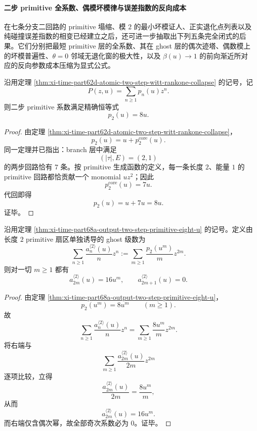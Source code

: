 \paragraph{二步 primitive 全系数、偶模坏模律与误差指数的反向成本}
在七条分支二回路的 primitive 塌缩、模 \(2\) 的最小坏模证人、正实退化点列表以及纯碰撞误差指数的相变已经建立之后，还可进一步抽取出下列五条完全闭式的后果。它们分别把最短 primitive 层的全系数、其在 ghost 层的偶次迹塔、偶数模上的坏模普遍性、\(\theta=0\) 邻域无退化窗的极大性，以及 \(\beta(u)\to 1\) 的前向渐近所对应的反向参数成本压缩为显式公式。

\begin{theorem}\label{thm:xi-time-part68a-output-two-step-primitive-eight-u}
沿用定理 \ref{thm:xi-time-part62d-atomic-two-step-witt-rankone-collapse} 的记号，记
\[
P(z,u)=\sum_{n\ge 1}p_n(u)z^n.
\]
则二步 primitive 系数满足精确恒等式
\[
p_2(u)=8u.
\]
\end{theorem}
\begin{proof}
由定理 \ref{thm:xi-time-part62d-atomic-two-step-witt-rankone-collapse}，
\[
p_2(u)=u+p_2^{\mathrm{core}}(u).
\]
同一定理并已指出：branch 层中满足
\[
(|\tau|,E)=(2,1)
\]
的两步回路恰有 \(7\) 条。按 primitive 生成函数的定义，每一条长度 \(2\)、能量 \(1\) 的 primitive 回路都恰贡献一个 monomial \(u z^2\)；因此
\[
p_2^{\mathrm{core}}(u)=7u.
\]
代回即得
\[
p_2(u)=u+7u=8u.
\]
证毕。
\end{proof}

\begin{corollary}\label{cor:xi-time-part68a-output-two-step-primitive-even-ghost-tower}
沿用定理 \ref{thm:xi-time-part68a-output-two-step-primitive-eight-u} 的记号。定义由长度 \(2\) primitive 扇区单独诱导的 ghost 级数为
\[
\sum_{n\ge 1}\frac{a_n^{\langle 2\rangle}(u)}{n}z^n
:=
\sum_{m\ge 1}\frac{p_2(u^m)}{m}z^{2m}.
\]
则对一切 \(m\ge 1\) 都有
\[
a_{2m}^{\langle 2\rangle}(u)=16u^m,
\qquad
a_{2m+1}^{\langle 2\rangle}(u)=0.
\]
\end{corollary}
\begin{proof}
由定理 \ref{thm:xi-time-part68a-output-two-step-primitive-eight-u}，
\[
p_2(u^m)=8u^m
\qquad (m\ge 1).
\]
故
\[
\sum_{n\ge 1}\frac{a_n^{\langle 2\rangle}(u)}{n}z^n
=
\sum_{m\ge 1}\frac{8u^m}{m}z^{2m}.
\]
将右端与
\[
\sum_{m\ge 1}\frac{a_{2m}^{\langle 2\rangle}(u)}{2m}z^{2m}
\]
逐项比较，立得
\[
\frac{a_{2m}^{\langle 2\rangle}(u)}{2m}=\frac{8u^m}{m},
\]
从而
\[
a_{2m}^{\langle 2\rangle}(u)=16u^m.
\]
而右端仅含偶次幂，故全部奇次系数必为 \(0\)。证毕。
\end{proof}

